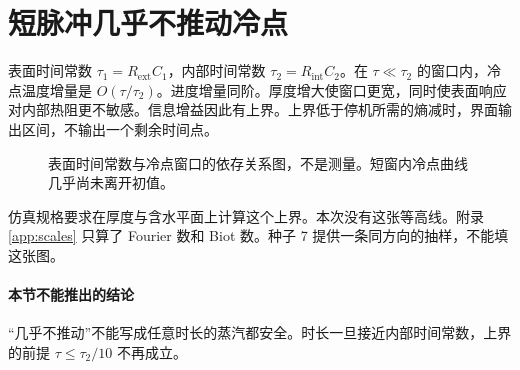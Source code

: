 \section{短脉冲几乎不推动冷点}

表面时间常数 \(\tau_1=R_{\mathrm{ext}}C_1\)，内部时间常数 \(\tau_2=R_{\mathrm{int}}C_2\)。在 \(\tau\ll\tau_2\) 的窗口内，冷点温度增量是 \(O(\tau/\tau_2)\)。进度增量同阶。厚度增大使窗口更宽，同时使表面响应对内部热阻更不敏感。信息增益因此有上界。上界低于停机所需的熵减时，界面输出区间，不输出一个剩余时间点。

\begin{figure}[ht]
\centering
{}
\caption{表面时间常数与冷点窗口的依存关系图，不是测量。短窗内冷点曲线几乎尚未离开初值。}
\end{figure}

仿真规格要求在厚度与含水平面上计算这个上界。本次没有这张等高线。附录 \ref{app:scales} 只算了 Fourier 数和 Biot 数。种子 7 提供一条同方向的抽样，不能填这张图。

\paragraph{本节不能推出的结论}
“几乎不推动”不能写成任意时长的蒸汽都安全。时长一旦接近内部时间常数，上界的前提 \(\tau\le\tau_2/10\) 不再成立。
